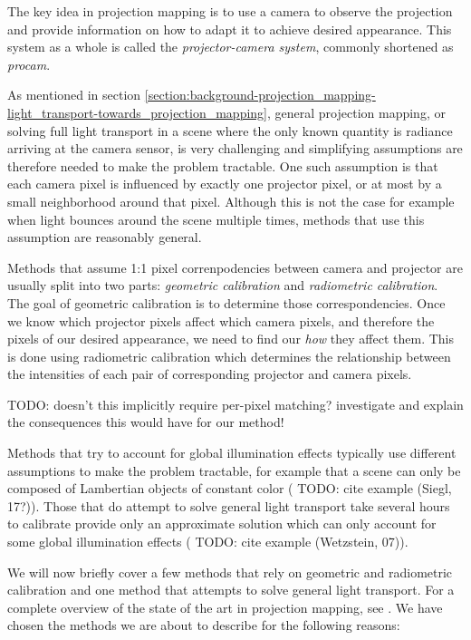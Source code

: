 The key idea in projection mapping is to use a camera to observe the projection and provide information on how to adapt it to achieve desired appearance. This system as a whole is called the \textit{projector-camera system}, commonly shortened as \textit{procam}.

As mentioned in section \ref{section:background-projection_mapping-light_transport-towards_projection_mapping}, general projection mapping, or solving full light transport in a scene where the only known quantity is radiance arriving at the camera sensor, is very challenging and simplifying assumptions are therefore needed to make the problem tractable. One such assumption is that each camera pixel is influenced by exactly one projector pixel, or at most by a small neighborhood around that pixel. Although this is not the case for example when light bounces around the scene multiple times, methods that use this assumption are reasonably general.

Methods that assume 1:1 pixel correnpodencies between camera and projector are usually split into two parts: \textit{geometric calibration} and \textit{radiometric calibration}. The goal of geometric calibration is to determine those correspondencies. Once we know which projector pixels affect which camera pixels, and therefore the pixels of our desired appearance, we need to find our \textit{how} they affect them. This is done using radiometric calibration which determines the relationship between the intensities of each pair of corresponding projector and camera pixels.

{\color{red} TODO: doesn't this implicitly require per-pixel matching? investigate and explain the consequences this would have for our method!}

Methods that try to account for global illumination effects typically use different assumptions to make the problem tractable, for example that a scene can only be composed of Lambertian objects of constant color ({\color{red} TODO: cite example (Siegl, 17?)}). Those that do attempt to solve general light transport take several hours to calibrate provide only an approximate solution which can only account for some global illumination effects ({\color{red} TODO: cite example (Wetzstein, 07)}).

We will now briefly cover a few methods that rely on geometric and radiometric calibration and one method that attempts to solve general light transport. For a complete overview of the state of the art in projection mapping, see \citet{Grundhofer2018}. We have chosen the methods we are about to describe for the following reasons:

